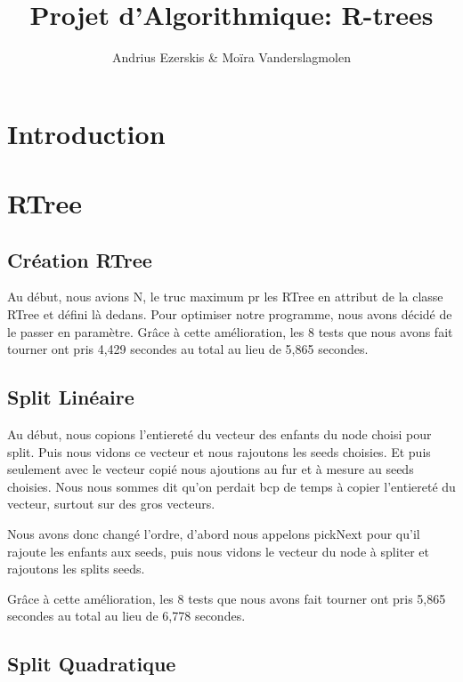 \documentclass[utf8]{article}
\begin{document}
\begin{titlepage}


\author{Andrius Ezerskis \& Moïra Vanderslagmolen}
\title{Projet d'Algorithmique: R-trees}

\maketitle
\end{titlepage}
\tableofcontents
\newpage
\begin{large}



\section{Introduction}
\indent
\par


\par
\section{RTree}
\subsection{Création RTree}
Au début, nous avions N, le truc maximum pr les RTree en attribut de la classe RTree et défini là dedans.
Pour optimiser notre programme, nous avons décidé de le passer en paramètre.
Grâce à cette amélioration, les 8 tests que nous avons fait tourner ont pris
4,429 secondes au total au lieu de 5,865 secondes.

\subsection{Split Linéaire}
Au début, nous copions l'entiereté du vecteur des enfants du node choisi pour
split. Puis nous vidons ce vecteur et nous rajoutons les seeds choisies. Et puis
seulement avec le vecteur copié nous ajoutions au fur et à mesure au seeds
choisies. Nous nous sommes dit qu'on perdait bcp de temps à copier l'entiereté
du vecteur, surtout sur des gros vecteurs.

Nous avons donc changé l'ordre, d'abord nous appelons pickNext pour qu'il
rajoute les enfants aux seeds, puis nous vidons le vecteur du node à spliter et
rajoutons les splits seeds.

Grâce à cette amélioration, les 8 tests que nous avons fait tourner ont pris
5,865 secondes au total au lieu de 6,778 secondes.
\subsection{Split Quadratique}



\end{large}
\end{document}
